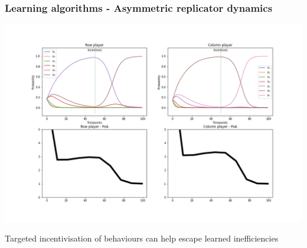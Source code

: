 \begin{frame}
    \frametitle{Learning algorithms - Asymmetric replicator dynamics}

    \includegraphics[scale=0.28]{Bin/ARD_penalty_game.png}
    
\end{frame}


\begin{frame}
    \centering
    \Huge{
    Targeted incentivisation of behaviours can help escape learned inefficiencies
    }
\end{frame}
